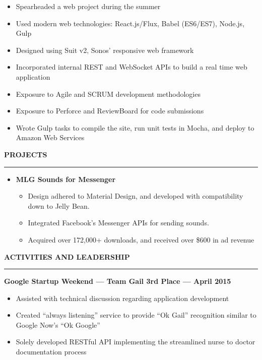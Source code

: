 \documentclass[10pt, oneside]{letter}
\newcommand{\linespaceshit} {
  \vspace{0.05in}
  \hrule
  \vspace{0.05in}
}
\begin{document}
\begin{adjustwidth}{0.1in}{0pt}
\begin{itemize}
            \begin{itemize}
              \item Spearheaded a web project during the summer
              \item Used modern web technologies: React.js/Flux, Babel (ES6/ES7), Node.js, Gulp
              \item Designed using Suit v2, Sonos' responsive web framework
              \item Incorporated internal REST and WebSocket APIs to build a real time web application
              \item Exposure to Agile and SCRUM development methodologies
              \item Exposure to Perforce and ReviewBoard for code submissions
              \item Wrote Gulp tasks to compile the site, run unit tests in Mocha, and deploy to Amazon Web Services
            \end{itemize}
      \end{itemize}

    \end{adjustwidth}

  \textbf{PROJECTS}
  \linespaceshit
    \begin{adjustwidth}{0.2in}{0pt}
      \begin{itemize}
        \item \textbf{MLG Sounds for Messenger}
          \begin{itemize}
            \item Design adhered to Material Design, and developed with compatibility down to Jelly Bean.
            \item Integrated Facebook's Messenger APIs for sending sounds.
            \item Acquired over 172,000+ downloads, and received over \$600 in ad revenue
          \end{itemize}

      \end{itemize}
    \end{adjustwidth}

  \textbf{ACTIVITIES AND LEADERSHIP}
  \linespaceshit
    \textbf{Google Startup Weekend --- Team Gail 3rd Place --- April 2015}
    \begin{adjustwidth}{0.2in}{0pt}
      \begin{itemize}
        \item Assisted with technical discussion regarding application development
        \item Created ``always listening'' service to provide ``Ok Gail'' recognition similar to Google Now's ``Ok Google''
        \item Solely developed RESTful API implementing the streamlined nurse to doctor documentation process
      \end{itemize}
    \end{adjustwidth}
\end{document}
